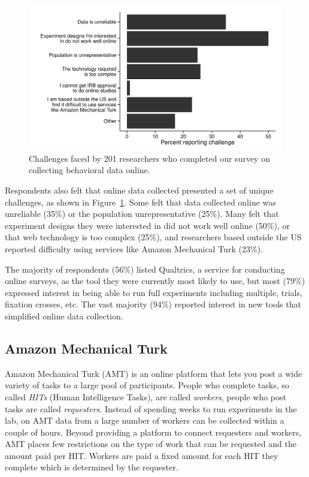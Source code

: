 \documentclass[twocolumn]{svjour3}          %
\begin{document}
\begin{figure}[tp]
\centering
\includegraphics[scale=.75]{figures/challenges.pdf}
\caption{Challenges faced by 201 researchers who completed our survey on collecting behavioral data online.}
\label{fig:challenges}
\end{figure}

Respondents also felt that online data collected presented a set of unique challenges, as shown in
Figure~\ref{fig:challenges}. Some felt that data collected online was unreliable (35\%) or the
population unrepresentative (25\%). Many felt that experiment designs they were interested in did
not work well online (50\%), or that web technology is too complex (25\%), and researchers based
outside the US reported difficulty using services like Amazon Mechanical Turk (23\%).


The majority of respondents (56\%) listed Qualtrics, a service for conducting online surveys, as the tool they
were currently most likely to use, but most (79\%) expressed interest in being able to run full
experiments including multiple, trials, fixation crosses, etc. The vast majority (94\%) reported
interest in new tools that simplified online data collection.


\subsection{Amazon Mechanical Turk} 

Amazon Mechanical Turk (AMT) is an online platform that lets you post a wide variety of tasks to a large pool of participants. People
who complete tasks, so called \emph{HITs} (Human Intelligence Tasks), are called \emph{workers}, people who post tasks are called
\emph{requesters}.
Instead of spending weeks to run experiments in the lab, on AMT data from a large number of workers can be collected within a couple of hours.
Beyond providing a platform to connect requesters and workers, AMT places few restrictions on the type of work that can be requested and the amount paid per HIT.
Workers are paid a fixed amount for each HIT they complete which is determined by the requester.
\end{document}
